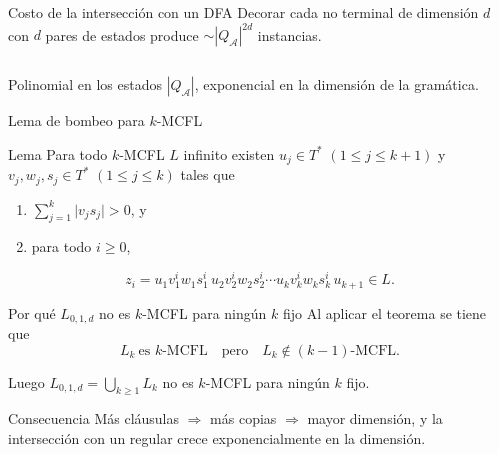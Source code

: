 \documentclass{beamer}
\newcommand{\repeatlang}{L_{0,1,d}}
\begin{document}
\begin{frame}{Costo de la intersección con un DFA}
    Decorar cada no terminal de dimensión \(d\) con \(d\) pares de estados
    produce \(\sim |Q_{\mathcal A}|^{2d}\) instancias.

    \[
    \]

    \pause
    \begin{center}
        Polinomial en los estados \(|Q_{\mathcal A}|\),
        \alert{exponencial en la dimensión} de la gramática.
    \end{center}
\end{frame}

\begin{frame}{Lema de bombeo para \(k\)-MCFL}
    \begin{block}{Lema}
        Para todo \(k\)-MCFL \(L\) infinito existen \(u_j\in T^*\)
        \((1\le j\le k+1)\) y \(v_j,w_j,s_j\in T^*\) \((1\le j\le k)\) tales que
        \begin{enumerate}
            \item \(\sum_{j=1}^{k}\lvert v_j s_j\rvert>0\), y
            \item para todo \(i\ge 0\),
        \end{enumerate}
        \[
            z_i=u_1 v_1^i w_1 s_1^i\, u_2 v_2^i w_2 s_2^i\cdots
            u_k v_k^i w_k s_k^i\, u_{k+1}\in L.
        \]
    \end{block}
\end{frame}

\begin{frame}{Por qué \(\repeatlang\) no es \(k\)-MCFL para ningún \(k\) fijo}
    Al aplicar el teorema se tiene que
    \[
        L_k\ \text{es }k\text{-MCFL}\quad\text{pero}\quad
        L_k\notin (k-1)\text{-MCFL.}
    \]
    \pause
    \begin{center}
        Luego \(\displaystyle\repeatlang=\bigcup_{k\ge 1}L_k\) no es
        \(k\)-MCFL para ningún \(k\) fijo.
    \end{center}
    \pause
    \begin{block}{Consecuencia}
        Más cláusulas \(\Rightarrow\) más copias \(\Rightarrow\) mayor
        dimensión, y la intersección con un regular crece
        \alert{exponencialmente} en la dimensión.
    \end{block}
\end{frame}
\end{document}
